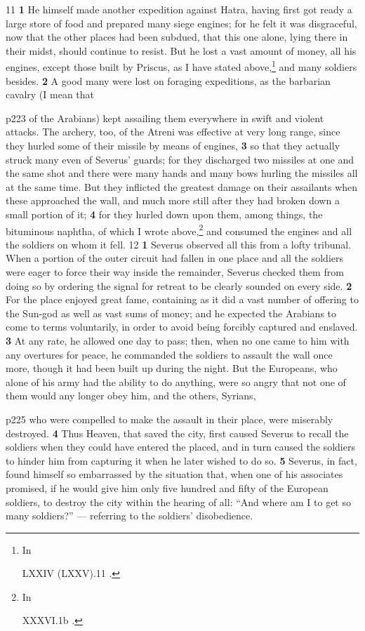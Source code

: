11
\textbf{1} He himself made another expedition against Hatra, having first got ready a large store of food and prepared many siege engines; for he felt it was disgraceful, now that the other places had been subdued, that this one alone, lying there in their midst, should continue to resist. But he lost a vast amount of money, all his engines, except those built by Priscus, as I have stated above,\texthebrew{⁠}\footnote{In

LXXIV (LXXV).11 .

} and many soldiers besides. \textbf{2} A good many were lost on foraging expeditions, as the barbarian cavalry (I mean that

p223 of the Arabians) kept assailing them everywhere in swift and violent attacks. The archery, too, of the Atreni was effective at very long range, since they hurled some of their missile by means of engines, \textbf{3} so that they actually struck many even of Severus' guards; for they discharged two missiles at one and the same shot and there were many hands and many bows hurling the missiles all at the same time. But they inflicted the greatest damage on their assailants when these approached the wall, and much more still after they had broken down a small portion of it; \textbf{4} for they hurled down upon them, among things, the bituminous naphtha, of which I wrote above,\texthebrew{⁠}\footnote{In

XXXVI.1b .

} and consumed the engines and all the soldiers on whom it fell.
12
\textbf{1} Severus observed all this from a lofty tribunal. When a portion of the outer circuit had fallen in one place and all the soldiers were eager to force their way inside the remainder, Severus checked them from doing so by ordering the signal for retreat to be clearly sounded on every side. \textbf{2} For the place enjoyed great fame, containing as it did a vast number of offering to the Sun-god as well as vast sums of money; and he expected the Arabians to come to terms voluntarily, in order to avoid being forcibly captured and enslaved. \textbf{3} At any rate, he allowed one day to pass; then, when no one came to him with any overtures for peace, he commanded the soldiers to assault the wall once more, though it had been built up during the night. But the Europeans, who alone of his army had the ability to do anything, were so angry that not one of them would any longer obey him, and the others, Syrians,

p225 who were compelled to make the assault in their place, were miserably destroyed. \textbf{4} Thus Heaven, that saved the city, first caused Severus to recall the soldiers when they could have entered the placed, and in turn caused the soldiers to hinder him from capturing it when he later wished to do so. \textbf{5} Severus, in fact, found himself so embarrassed by the situation that, when one of his associates promised, if he would give him only five hundred and fifty of the European soldiers, to destroy the city within the hearing of all: ``And where am I to get so many soldiers?'' \texthebrew{—} referring to the soldiers' disobedience.

